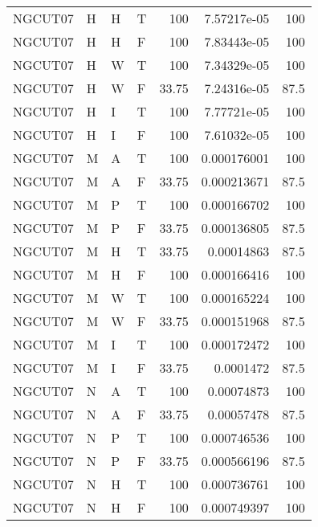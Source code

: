 \begin{longtable}{llllrrr}
    NGCUT07  & H     & H     & T          & 100        & 7.57217e-05 & 100      \\
    NGCUT07  & H     & H     & F          & 100        & 7.83443e-05 & 100      \\
    NGCUT07  & H     & W     & T          & 100        & 7.34329e-05 & 100      \\
    NGCUT07  & H     & W     & F          & 33.75      & 7.24316e-05 & 87.5     \\
    NGCUT07  & H     & I     & T          & 100        & 7.77721e-05 & 100      \\
    NGCUT07  & H     & I     & F          & 100        & 7.61032e-05 & 100      \\
    NGCUT07  & M     & A     & T          & 100        & 0.000176001 & 100      \\
    NGCUT07  & M     & A     & F          & 33.75      & 0.000213671 & 87.5     \\
    NGCUT07  & M     & P     & T          & 100        & 0.000166702 & 100      \\
    NGCUT07  & M     & P     & F          & 33.75      & 0.000136805 & 87.5     \\
    NGCUT07  & M     & H     & T          & 33.75      & 0.00014863  & 87.5     \\
    NGCUT07  & M     & H     & F          & 100        & 0.000166416 & 100      \\
    NGCUT07  & M     & W     & T          & 100        & 0.000165224 & 100      \\
    NGCUT07  & M     & W     & F          & 33.75      & 0.000151968 & 87.5     \\
    NGCUT07  & M     & I     & T          & 100        & 0.000172472 & 100      \\
    NGCUT07  & M     & I     & F          & 33.75      & 0.0001472   & 87.5     \\
    NGCUT07  & N     & A     & T          & 100        & 0.00074873  & 100      \\
    NGCUT07  & N     & A     & F          & 33.75      & 0.00057478  & 87.5     \\
    NGCUT07  & N     & P     & T          & 100        & 0.000746536 & 100      \\
    NGCUT07  & N     & P     & F          & 33.75      & 0.000566196 & 87.5     \\
    NGCUT07  & N     & H     & T          & 100        & 0.000736761 & 100      \\
    NGCUT07  & N     & H     & F          & 100        & 0.000749397 & 100      \\

\end{longtable}
